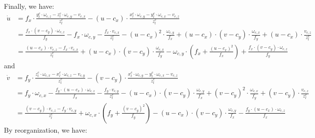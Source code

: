 \documentclass[12pt, onecolumn]{article}
\begin{document}
	Finally, we have:
	\begin{equation}
	\begin{aligned}
	\dot{u}&=f_x\cdot\frac{
		y_l^c\cdot\omega_{c,z}-z_l^c\cdot\omega_{c,y}-v_{c,x}
		}{z_l^c}-
		\left( u-c_x\right) \cdot
		\frac{
		x_l^c\cdot\omega_{c,y}-y_l^c\cdot\omega_{c,x}-v_{c,z}
		}{z_l^c}\\
		&=\frac{f_x\cdot \left( v-c_y\right) \cdot\omega_{c,z}}{f_y}
		-f_x\cdot\omega_{c,y}
		-\frac{f_x\cdot v_{c,x}}{z_l^c}
		-\left( u-c_x\right)^2 \cdot\frac{\omega_{c,y}}{f_x}
		+\left( u-c_x\right)\cdot\left( v-c_y\right) \cdot\frac{\omega_{c,x}}{f_y}
		+\left( u-c_x\right)\cdot\frac{v_{c,z}}{z_l^c}\\
		&=\frac{\left( u-c_x\right)\cdot v_{c,z}-f_x\cdot v_{c,x}}{z_l^c}
		+\left( u-c_x\right)\cdot\left( v-c_y\right)\cdot\frac{\omega_{c,x}}{f_y}
		-\omega_{c,y}\cdot\left(f_x+\frac{\left( u-c_x\right)^2}{f_x} \right) 
		+\frac{f_x\cdot \left( v-c_y\right) \cdot\omega_{c,z}}{f_y}
	\end{aligned}
	\end{equation}
	and
	\begin{equation}
	\begin{aligned}
	\dot{v}&=f_y\cdot\frac{z_l^c\cdot\omega_{c,x}-x_l^c\cdot\omega_{c,z}-v_{c,y}}{z_l^c}-
	\left( v-c_y\right) \cdot
	\frac{x_l^c\cdot\omega_{c,y}-y_l^c\cdot\omega_{c,x}-v_{c,z}}{z_l^c}\\
	&=f_y\cdot\omega_{c,x}
	-\frac{f_y\cdot \left( u-c_x\right) \cdot\omega_{c,z}}{f_x}
	-\frac{f_y\cdot v_{c,y}}{z_l^c}
	-\left( u-c_x\right)\cdot\left( v-c_y\right) \cdot\frac{\omega_{c,y}}{f_x}
	+\left( v-c_y\right)^2 \cdot\frac{\omega_{c,x}}{f_y}
	+\left( v-c_y\right)\cdot\frac{v_{c,z}}{z_l^c}\\
	&=\frac{\left( v-c_y\right)\cdot v_{c,z}-f_y\cdot v_{c,y}}{z_l^c}
	+\omega_{c,x}\cdot\left(f_y+\frac{\left( v-c_y\right)^2}{f_y} \right) 
	-\left( u-c_x\right)\cdot\left( v-c_y\right)\cdot\frac{\omega_{c,y}}{f_x}
	-\frac{f_y\cdot \left( u-c_x\right) \cdot\omega_{c,z}}{f_x}
	\end{aligned}
	\end{equation}
	By reorganization, we have:
\end{document}
